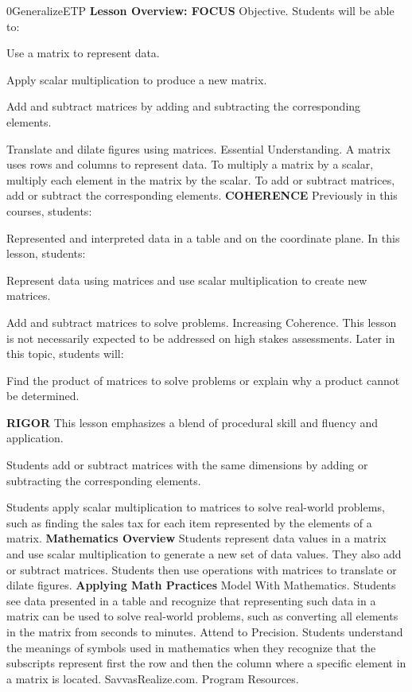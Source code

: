 \documentclass{article}
\newenvironment{te-addendum}[2]{}{}     %
\newcommand{\te}[1]{}                   %
\begin{document}
\begin{te-addendum}{0}{GeneralizeETP}
\textbf{Lesson Overview: FOCUS}
Objective. Students will be able to:
\item Use a matrix to represent data.
\item Apply scalar multiplication to produce a new matrix.
\item Add and subtract matrices by adding and subtracting the corresponding elements.
\item Translate and dilate figures using matrices.
Essential Understanding. A matrix uses rows and columns to represent data. To multiply a matrix by a scalar, multiply each element in the matrix by the scalar. To add or subtract matrices, add or subtract the corresponding elements.
\textbf{COHERENCE}
Previously in this courses, students:
\item Represented and interpreted data in a table and on the coordinate plane.
In this lesson, students:
\item Represent data using matrices and use scalar multiplication to create new matrices.
\item Add and subtract matrices to solve problems.
Increasing Coherence. This lesson is not necessarily expected to be addressed on high stakes assessments.
Later in this topic, students will:
\item Find the product of matrices to solve problems or explain why a product cannot be determined.
\te{Printed "in this courses"; likely "in this course".}
\textbf{RIGOR}
This lesson emphasizes a blend of procedural skill and fluency and application.
\item Students add or subtract matrices with the same dimensions by adding or subtracting the corresponding elements.
\item Students apply scalar multiplication to matrices to solve real-world problems, such as finding the sales tax for each item represented by the elements of a matrix.
\textbf{Mathematics Overview}
Students represent data values in a matrix and use scalar multiplication to generate a new set of data values. They also add or subtract matrices. Students then use operations with matrices to translate or dilate figures.
\textbf{Applying Math Practices}
Model With Mathematics. Students see data presented in a table and recognize that representing such data in a matrix can be used to solve real-world problems, such as converting all elements in the matrix from seconds to minutes.
Attend to Precision. Students understand the meanings of symbols used in mathematics when they recognize that the subscripts represent first the row and then the column where a specific element in a matrix is located.
SavvasRealize.com. Program Resources.
\end{te-addendum}
\end{document}

